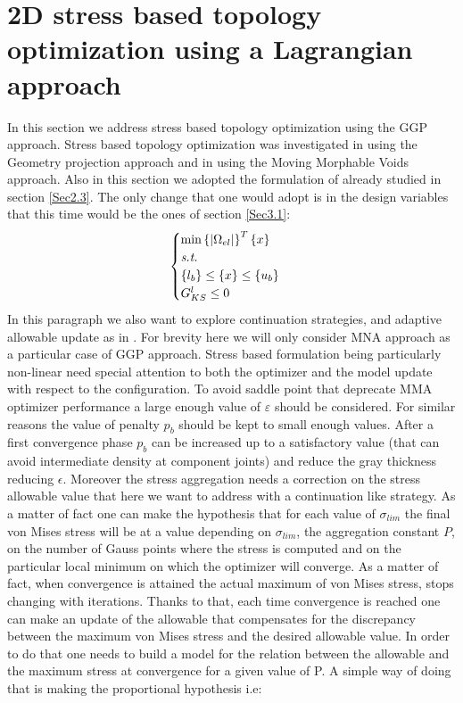 \section{2D stress based topology optimization using a Lagrangian approach}
\label{IS}
In this section we address stress based topology optimization using the GGP approach. Stress based topology optimization was investigated in \cite{ZHANG20171} using the Geometry projection approach and in \cite{zhang2018moving} using the Moving Morphable Voids approach. Also in this section we adopted the formulation of \cite{verbart2017unified} already studied in section \ref{Sec2.3}. The only change that one would adopt is in the design variables that this time would be the ones of section \ref{Sec3.1}:
\begin{equation}
\begin{cases}
\label{Verbart_formulation_GGP}
\min {\ensuremath\left\lbrace{|\Omega_{el}|}\right \rbrace^T\ensuremath\left\lbrace{x}\right \rbrace} \\
\textit{s.t.}\\
\left\lbrace{l_b}\right \rbrace\leq\left\lbrace{x}\right \rbrace\leq\left\lbrace{u_b}\right \rbrace\\
G^{l}_{KS}\leq 0 
\end{cases}
\end{equation}
In this paragraph we also want to explore continuation strategies, and adaptive allowable update as in \cite{le2010stress,ZHANG20171}. For brevity here we will only consider MNA approach as a particular case of GGP approach. Stress based formulation being particularly non-linear need special attention to both the optimizer and the model update with respect to the configuration. 
To avoid saddle point that deprecate MMA optimizer performance a large enough value of $\varepsilon$ should be considered. For similar reasons the value of penalty $p_b$ should be kept to small enough values. After a first convergence phase $p_b$ can be increased up to a satisfactory value (that can avoid intermediate density at component joints) and reduce the gray thickness reducing $\epsilon$. Moreover the stress aggregation needs a correction on the stress allowable value that here we want to address with a continuation like strategy. 
As a matter of fact one can make the hypothesis that for each value of $\sigma_{lim}$ the final von Mises stress will be at a value depending on $\sigma_{lim}$, the aggregation constant $P$, on the number of Gauss points where the stress is computed and on the particular local minimum on which the optimizer will converge. As a matter of fact, when convergence is attained the actual maximum of von Mises stress, stops changing with iterations. Thanks to that, each time convergence is reached one can make an update of the allowable that compensates for the discrepancy between the maximum von Mises stress and the desired allowable value. In order to do that one needs to build a model for the relation between the allowable and the maximum stress at convergence for a given value of P. A simple way of doing that is making the proportional hypothesis i.e:
